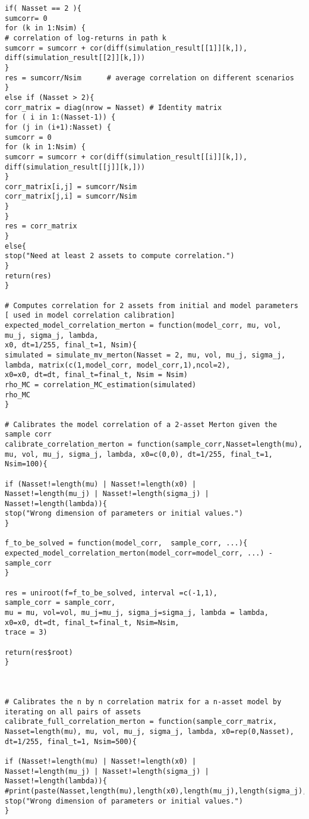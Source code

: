 \begin{lstlisting}
if( Nasset == 2 ){
sumcorr= 0
for (k in 1:Nsim) {
# correlation of log-returns in path k
sumcorr = sumcorr + cor(diff(simulation_result[[1]][k,]), diff(simulation_result[[2]][k,]))
}
res = sumcorr/Nsim      # average correlation on different scenarios
}
else if (Nasset > 2){
corr_matrix = diag(nrow = Nasset) # Identity matrix 
for ( i in 1:(Nasset-1)) {
for (j in (i+1):Nasset) {
sumcorr = 0
for (k in 1:Nsim) {
sumcorr = sumcorr + cor(diff(simulation_result[[i]][k,]), diff(simulation_result[[j]][k,]))
}
corr_matrix[i,j] = sumcorr/Nsim
corr_matrix[j,i] = sumcorr/Nsim
}
}
res = corr_matrix
}
else{
stop("Need at least 2 assets to compute correlation.")
}
return(res)
}

# Computes correlation for 2 assets from initial and model parameters [ used in model correlation calibration]
expected_model_correlation_merton = function(model_corr, mu, vol, mu_j, sigma_j, lambda,
x0, dt=1/255, final_t=1, Nsim){
simulated = simulate_mv_merton(Nasset = 2, mu, vol, mu_j, sigma_j, lambda, matrix(c(1,model_corr, model_corr,1),ncol=2),
x0=x0, dt=dt, final_t=final_t, Nsim = Nsim)
rho_MC = correlation_MC_estimation(simulated)
rho_MC
}

# Calibrates the model correlation of a 2-asset Merton given the sample corr
calibrate_correlation_merton = function(sample_corr,Nasset=length(mu), mu, vol, mu_j, sigma_j, lambda, x0=c(0,0), dt=1/255, final_t=1, Nsim=100){

if (Nasset!=length(mu) | Nasset!=length(x0) |
Nasset!=length(mu_j) | Nasset!=length(sigma_j) | Nasset!=length(lambda)){
stop("Wrong dimension of parameters or initial values.")
}

f_to_be_solved = function(model_corr,  sample_corr, ...){
expected_model_correlation_merton(model_corr=model_corr, ...) - sample_corr
}

res = uniroot(f=f_to_be_solved, interval =c(-1,1),
sample_corr = sample_corr,
mu = mu, vol=vol, mu_j=mu_j, sigma_j=sigma_j, lambda = lambda,
x0=x0, dt=dt, final_t=final_t, Nsim=Nsim,
trace = 3)

return(res$root)
}



# Calibrates the n by n correlation matrix for a n-asset model by iterating on all pairs of assets
calibrate_full_correlation_merton = function(sample_corr_matrix, Nasset=length(mu), mu, vol, mu_j, sigma_j, lambda, x0=rep(0,Nasset), dt=1/255, final_t=1, Nsim=500){

if (Nasset!=length(mu) | Nasset!=length(x0) |
Nasset!=length(mu_j) | Nasset!=length(sigma_j) | Nasset!=length(lambda)){
#print(paste(Nasset,length(mu),length(x0),length(mu_j),length(sigma_j),length(lambda)))
stop("Wrong dimension of parameters or initial values.")
}


\end{lstlisting}
